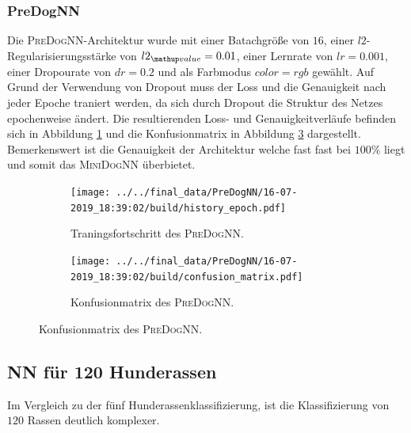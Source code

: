 \subsubsection{PreDogNN}
Die \textsc{PreDogNN}-Architektur wurde mit einer Batachgröße von $16$, einer
$l2$-Regularisierungsstärke von $l2\ua{value}=0.01$, einer Lernrate von
$lr=0.001$, einer Dropourate von $dr=0.2$ und als Farbmodus $color=rgb$ gewählt.
Auf Grund der Verwendung von Dropout muss der Loss und die Genauigkeit nach jeder
Epoche traniert werden, da sich durch Dropout die Struktur des Netzes epochenweise
ändert. Die resultierenden Loss- und Genauigkeitverläufe befinden sich in Abbildung
\ref{fig:PreDogNN_Loss_Acc} und die Konfusionmatrix in Abbildung \ref{fig:PreDogNN_Konfusionmatrix}
dargestellt. Bemerkenswert ist die Genauigkeit der Architektur welche fast
fast bei $100\%$ liegt und somit das \textsc{MiniDogNN} überbietet.

\begin{figure}
\centering
\begin{subfigure}{0.48\textwidth}
\centering
\texttt{[image: ../../final\_data/PreDogNN/16-07-2019\_18:39:02/build/history\_epoch.pdf]}
\caption{Traningsfortschritt des \textsc{PreDogNN}.}
\label{fig:PreDogNN_Loss_Acc}
\end{subfigure}
\begin{subfigure}{0.48\textwidth}
\centering
\texttt{[image: ../../final\_data/PreDogNN/16-07-2019\_18:39:02/build/confusion\_matrix.pdf]}
\caption{Konfusionmatrix des \textsc{PreDogNN}.}
\label{fig:PreDogNN_Konfusionmatrix}
\end{subfigure}
\end{figure}
\subsection{NN für 120 Hunderassen}
Im Vergleich zu der fünf Hunderassenklassifizierung, ist die Klassifizierung
von $120$ Rassen deutlich komplexer.
